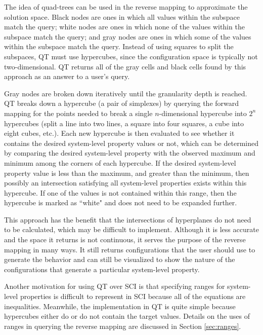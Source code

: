 The idea of quad-trees can be used in the reverse mapping to approximate the solution space.
Black nodes are ones in which all values within the subspace match the query;
white nodes are ones in which none of the values within the subspace match the query;
and gray nodes are ones in which some of the values within the subspace match the query.
Instead of using squares to split the subspaces, QT must use hypercubes, since the configuration space is typically not two-dimensional.
QT returns all of the gray cells and black cells found by this approach as an answer to a user's query.

Gray nodes are broken down iteratively until the granularity depth is reached.
QT breaks down a hypercube (a pair of simplexes) by querying the forward mapping for the points needed to break a single $n$-dimensional hypercube into $2^n$ hypercubes (split a line into two lines, a square into four squares, a cube into eight cubes, etc.).
Each new hypercube is then evaluated to see whether it contains the desired system-level property values or not, which can be determined by comparing the desired system-level property with the observed maximum and minimum among the corners of each hypercube.
If the desired system-level property value is less than the maximum, and greater than the minimum, then possibly an intersection satisfying all system-level properties exists within this hypercube.
If one of the values is not contained within this range, then the hypercube is marked as ``white" and does not need to be expanded further.

This approach has the benefit that the intersections of hyperplanes do not need to be calculated, which may be difficult to implement.
Although it is less accurate and the space it returns is not continuous, it serves the purpose of the reverse mapping in many ways.
It still returns configurations that the user should use to generate the behavior and can still be visualized to show the nature of the configurations that generate a particular system-level property.

Another motivation for using QT over SCI is that specifying ranges for system-level properties is difficult to represent in SCI because all of the equations are inequalities.
Meanwhile, the implementation in QT is quite simple because hypercubes either do or do not contain the target values.
Details on the uses of ranges in querying the reverse mapping are discussed in Section \ref{sec:ranges}.

